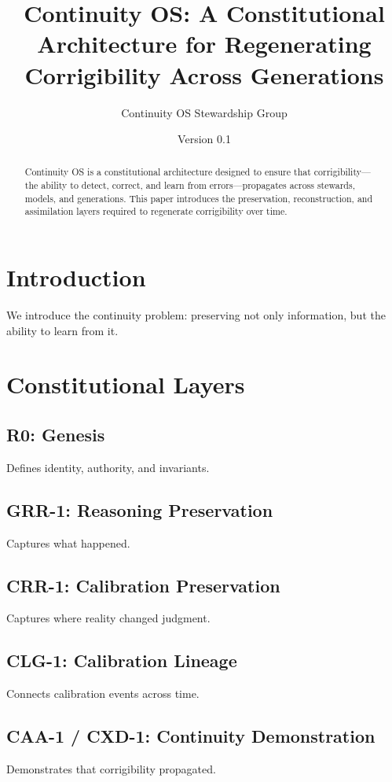 \documentclass[11pt]{article}
\title{Continuity OS: A Constitutional Architecture for Regenerating Corrigibility Across Generations}
\author{Continuity OS Stewardship Group}
\date{Version 0.1}
\begin{document}
\maketitle

\begin{abstract}
Continuity OS is a constitutional architecture designed to ensure that corrigibility---the ability to detect, correct, and learn from errors---propagates across stewards, models, and generations. This paper introduces the preservation, reconstruction, and assimilation layers required to regenerate corrigibility over time.
\end{abstract}

\section{Introduction}
We introduce the continuity problem: preserving not only information, but the ability to learn from it.

\section{Constitutional Layers}
\subsection{R0: Genesis}
Defines identity, authority, and invariants.

\subsection{GRR-1: Reasoning Preservation}
Captures what happened.

\subsection{CRR-1: Calibration Preservation}
Captures where reality changed judgment.

\subsection{CLG-1: Calibration Lineage}
Connects calibration events across time.

\subsection{CAA-1 / CXD-1: Continuity Demonstration}
Demonstrates that corrigibility propagated.
\end{document}
